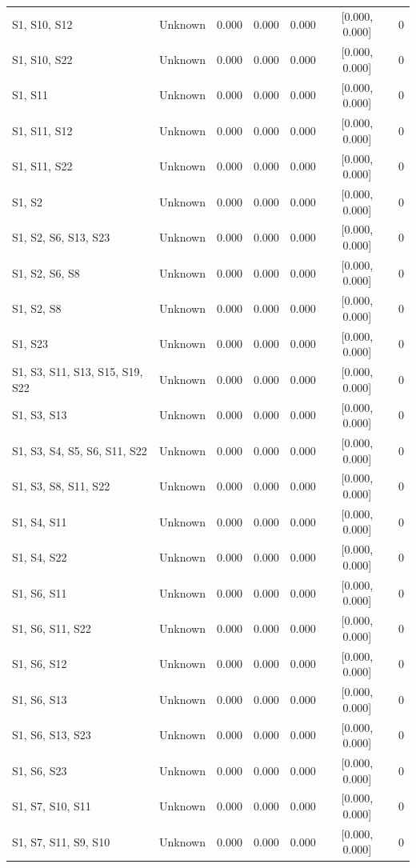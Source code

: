 \begin{table}[h]
\begin{tabular}{llccccr}
S1, S10, S12 & Unknown & 0.000 & 0.000 & 0.000 & [0.000, 0.000] & 0 \\
S1, S10, S22 & Unknown & 0.000 & 0.000 & 0.000 & [0.000, 0.000] & 0 \\
S1, S11 & Unknown & 0.000 & 0.000 & 0.000 & [0.000, 0.000] & 0 \\
S1, S11, S12 & Unknown & 0.000 & 0.000 & 0.000 & [0.000, 0.000] & 0 \\
S1, S11, S22 & Unknown & 0.000 & 0.000 & 0.000 & [0.000, 0.000] & 0 \\
S1, S2 & Unknown & 0.000 & 0.000 & 0.000 & [0.000, 0.000] & 0 \\
S1, S2, S6, S13, S23 & Unknown & 0.000 & 0.000 & 0.000 & [0.000, 0.000] & 0 \\
S1, S2, S6, S8 & Unknown & 0.000 & 0.000 & 0.000 & [0.000, 0.000] & 0 \\
S1, S2, S8 & Unknown & 0.000 & 0.000 & 0.000 & [0.000, 0.000] & 0 \\
S1, S23 & Unknown & 0.000 & 0.000 & 0.000 & [0.000, 0.000] & 0 \\
S1, S3, S11, S13, S15, S19, S22 & Unknown & 0.000 & 0.000 & 0.000 & [0.000, 0.000] & 0 \\
S1, S3, S13 & Unknown & 0.000 & 0.000 & 0.000 & [0.000, 0.000] & 0 \\
S1, S3, S4, S5, S6, S11, S22 & Unknown & 0.000 & 0.000 & 0.000 & [0.000, 0.000] & 0 \\
S1, S3, S8, S11, S22 & Unknown & 0.000 & 0.000 & 0.000 & [0.000, 0.000] & 0 \\
S1, S4, S11 & Unknown & 0.000 & 0.000 & 0.000 & [0.000, 0.000] & 0 \\
S1, S4, S22 & Unknown & 0.000 & 0.000 & 0.000 & [0.000, 0.000] & 0 \\
S1, S6, S11 & Unknown & 0.000 & 0.000 & 0.000 & [0.000, 0.000] & 0 \\
S1, S6, S11, S22 & Unknown & 0.000 & 0.000 & 0.000 & [0.000, 0.000] & 0 \\
S1, S6, S12 & Unknown & 0.000 & 0.000 & 0.000 & [0.000, 0.000] & 0 \\
S1, S6, S13 & Unknown & 0.000 & 0.000 & 0.000 & [0.000, 0.000] & 0 \\
S1, S6, S13, S23 & Unknown & 0.000 & 0.000 & 0.000 & [0.000, 0.000] & 0 \\
S1, S6, S23 & Unknown & 0.000 & 0.000 & 0.000 & [0.000, 0.000] & 0 \\
S1, S7, S10, S11 & Unknown & 0.000 & 0.000 & 0.000 & [0.000, 0.000] & 0 \\
S1, S7, S11, S9, S10 & Unknown & 0.000 & 0.000 & 0.000 & [0.000, 0.000] & 0 \\

\end{tabular}
\end{table}
